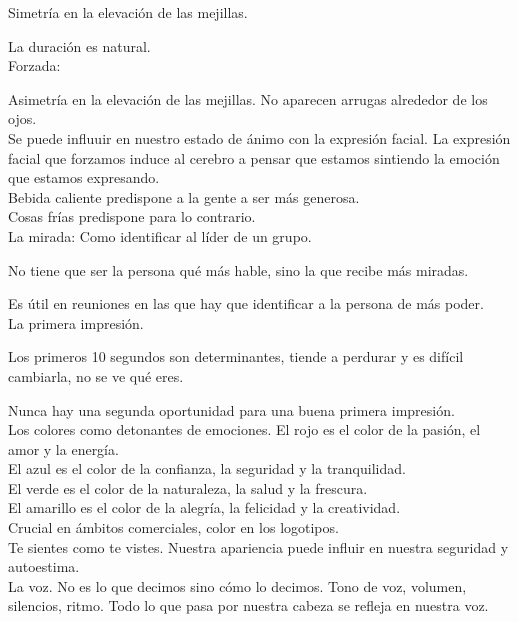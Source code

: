 \documentclass[12pt, a4paper, twoside]{article}
\begin{document}
Simetría en la elevación de las mejillas.

La duración es natural.\\
Forzada:

Asimetría en la elevación de las mejillas.
No aparecen arrugas alrededor de los ojos.\\


Se puede influuir en nuestro estado de ánimo con la expresión facial.
La expresión facial que forzamos induce al cerebro a pensar que estamos 
sintiendo la emoción que estamos expresando.\\

Bebida caliente predispone a la gente a ser más generosa.\\
Cosas frías predispone para lo contrario.\\

La mirada:
Como identificar al líder de un grupo.

No tiene que ser la persona qué más hable, sino la que recibe más miradas.

Es útil en reuniones en las que hay que identificar a la persona de más poder.\\

La primera impresión.

Los primeros 10 segundos son determinantes, tiende a perdurar y es difícil cambiarla, 
no se ve qué eres.

Nunca hay una segunda oportunidad para una buena primera impresión.\\

Los colores como detonantes de emociones.
El rojo es el color de la pasión, el amor y la energía.\\
El azul es el color de la confianza, la seguridad y la tranquilidad.\\
El verde es el color de la naturaleza, la salud y la frescura.\\
El amarillo es el color de la alegría, la felicidad y la creatividad.\\
Crucial en ámbitos comerciales, color en los logotipos.\\

Te sientes como te vistes.
Nuestra apariencia puede influir en nuestra seguridad y autoestima.\\

La voz. No es lo que decimos sino cómo lo decimos. Tono de voz, volumen, 
silencios, ritmo. Todo lo que pasa por nuestra cabeza se refleja
en nuestra voz.\\
\end{document}
